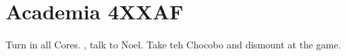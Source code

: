 \chapter{Academia 4XXAF}

Turn in all Cores. , talk to Noel. Take teh Chocobo and dismount at the game. 
\newline